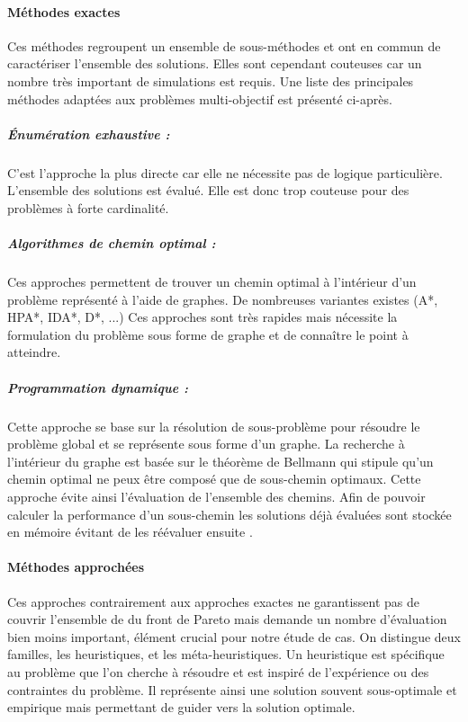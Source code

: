 \paragraph{Méthodes exactes} %
\label{par:methodes_exactes}
Ces méthodes regroupent un ensemble de sous-méthodes et ont en commun de caractériser
l’ensemble des solutions. Elles sont cependant couteuses car un nombre très important
de simulations est requis. Une liste des principales méthodes adaptées aux problèmes
multi-objectif est présenté ci-après.

\subparagraph{Énumération exhaustive :} %
\label{subp:enumeration_exhaustive}
C’est l’approche la plus directe car elle ne nécessite pas de logique particulière.
L’ensemble des solutions est évalué. Elle est donc trop couteuse pour des problèmes
à forte cardinalité.

\subparagraph{Algorithmes de chemin optimal :} %
\label{subp:algorithmes_de_chemin_optimal}
Ces approches permettent de trouver un chemin optimal à l’intérieur d’un problème
représenté à l’aide de graphes. De nombreuses variantes existes (A*, HPA*, IDA*, D*, ...)
Ces approches sont très rapides mais nécessite la formulation du problème sous forme
de graphe et de connaître le point à atteindre.


\subparagraph{Programmation dynamique :} %
\label{subp:programmation_dynamique}
Cette approche se base sur la résolution de sous-problème pour résoudre le problème global
et se représente sous forme d’un graphe. La recherche à l’intérieur du graphe est basée sur le théorème
de Bellmann qui stipule qu’un chemin optimal ne peux être composé que de sous-chemin
optimaux.  Cette approche évite ainsi l’évaluation de l’ensemble des chemins. Afin de
pouvoir calculer la performance d’un sous-chemin les solutions déjà évaluées sont
stockée en mémoire évitant de les réévaluer ensuite \parencite{Rivallain2013}.




\paragraph{Méthodes approchées} %
\label{par:methodes_approchees}
Ces approches contrairement aux approches exactes ne garantissent pas de couvrir
l’ensemble de du front de Pareto mais demande un nombre d’évaluation bien moins
important, élément crucial pour notre étude de cas. On distingue deux familles,
les heuristiques, et les méta-heuristiques.
Un heuristique est spécifique au problème que l’on cherche à résoudre et est
inspiré de l’expérience ou des contraintes du problème. Il représente ainsi une
solution souvent sous-optimale et empirique mais permettant de guider vers la solution
optimale.

